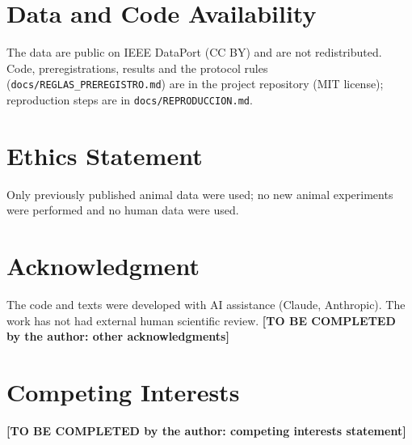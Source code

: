 \documentclass[journal,twoside]{IEEEtran}
\newcommand{\TBC}[1]{\textbf{[TO BE COMPLETED by the author: #1]}}
\begin{document}
\section*{Data and Code Availability}
The data are public on IEEE DataPort \cite{dataport} (CC BY) and are not redistributed. Code, preregistrations,
results and the protocol rules (\nolinkurl{docs/REGLAS_PREREGISTRO.md}) are in the project repository \cite{repo}
(MIT license); reproduction steps are in \nolinkurl{docs/REPRODUCCION.md}.

\section*{Ethics Statement}
Only previously published animal data were used; no new animal experiments were performed and no human data were
used.

\section*{Acknowledgment}
The code and texts were developed with AI assistance (Claude, Anthropic). The work has not had external human
scientific review. \TBC{other acknowledgments}

\section*{Competing Interests}
\TBC{competing interests statement}
\end{document}

